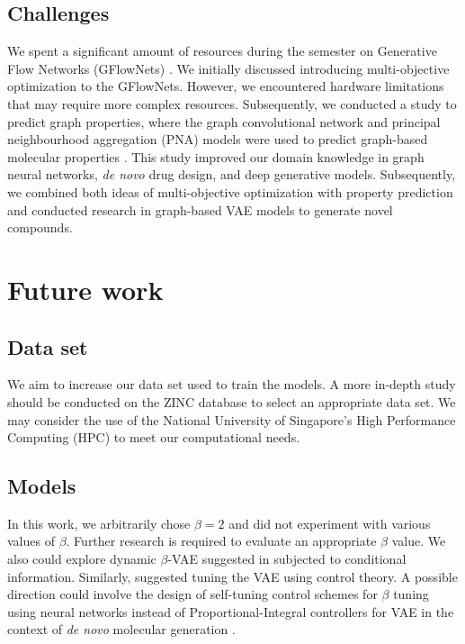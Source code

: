\subsection{Challenges} We spent a significant amount of resources during the semester on Generative Flow Networks (GFlowNets) \cite{https://doi.org/10.48550/arxiv.2111.09266}. We initially discussed introducing multi-objective optimization to the GFlowNets. However, we encountered hardware limitations that may require more complex resources. Subsequently, we conducted a study to predict graph properties, where the graph convolutional network and principal neighbourhood aggregation (PNA) models were used to predict graph-based molecular properties \cite{sun2020graph, kong2021end}. This study improved our domain knowledge in graph neural networks, \textit{de novo} drug design, and deep generative models. Subsequently, we combined both ideas of multi-objective optimization with property prediction and conducted research in graph-based VAE models to generate novel compounds. 

\section{Future work}
\subsection{Data set} We aim to increase our data set used to train the models. A more in-depth study should be conducted on the ZINC database to select an appropriate data set. We may consider the use of the National University of Singapore's High Performance Computing (HPC) to meet our computational needs.

\subsection{Models} In this work, we arbitrarily chose $\beta = 2$ and did not experiment with various values of $\beta$. Further research is required to evaluate an appropriate $\beta$ value. We also could explore dynamic $\beta$-VAE suggested in \cite{rydhmer2021dynamic} subjected to conditional information. Similarly, \cite{shao2020controlvae, shao2021controlvae} suggested tuning the VAE using control theory. A possible direction could involve the design of self-tuning control schemes for $\beta$ tuning using neural networks instead of Proportional-Integral controllers for VAE in the context of \textit{de novo} molecular generation \cite{ang2018proposed}. 

